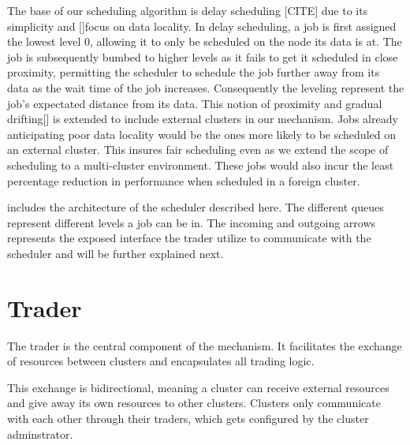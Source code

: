 The base of our scheduling algorithm is delay scheduling [CITE] due to its
simplicity and []focus on data locality. In delay scheduling, a job is first
assigned the lowest level 0, allowing it to only be scheduled on the node its
data is at. The job is subsequently bumbed to higher levels as it fails to get
it scheduled in close proximity, permitting the scheduler to schedule the job
further away from its data as the wait time of the job increases. Consequently
the leveling represent the job's expectated distance from its data. This notion
of proximity and gradual drifting[] is extended to include external clusters in
our mechanism. Jobs already anticipating poor data locality would be the ones
more likely to be scheduled on an external cluster. This insures fair
scheduling even as we extend the scope of scheduling to a multi-cluster
environment. These jobs would also incur the least percentage reduction in
performance when scheduled in a foreign cluster.

 includes the architecture of the scheduler described here. The
different queues represent different levels a job can be in. The incoming and
outgoing arrows represents the exposed interface the trader utilize to
communicate with the scheduler and will be further explained next.






\section{Trader} \label{trader}

The trader is the central component of the mechanism. It facilitates the
exchange of resources between clusters and encapsulates all trading logic. 

This exchange is bidirectional, meaning a cluster can receive external
resources and give away its own resources to other clusters. Clusters only
communicate with each other through their traders, which gets configured by the
cluster adminstrator. 

